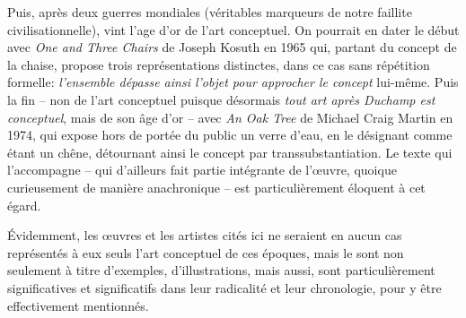 Puis, après deux guerres mondiales (véritables marqueurs de notre faillite civilisationnelle), vint l'age d'or de l'art conceptuel. On pourrait en dater le début avec \textit{One and Three Chairs} de Joseph Kosuth en 1965 qui, partant du concept de la chaise, propose trois représentations distinctes, dans ce cas sans répétition formelle: \textit{l'ensemble dépasse ainsi l’objet pour approcher le concept} lui-même. 
Puis la fin -- non de l'art conceptuel puisque désormais \textit{tout art après Duchamp est conceptuel}, %
mais de son âge d'or -- avec \textit{An Oak Tree} de Michael Craig Martin en 1974, qui expose hors de portée du public un verre d'eau, en le désignant comme étant un chêne, détournant ainsi le concept par transsubstantiation. Le texte qui l'accompagne -- qui d'ailleurs fait partie intégrante de l'œuvre, quoique curieusement de manière anachronique -- est particulièrement éloquent à cet égard.  

Évidemment, les œuvres et les artistes cités ici ne seraient en aucun cas représentés à eux seuls l'art conceptuel de ces époques, mais le sont non seulement à titre d'exemples, d'illustrations, mais aussi, sont particulièrement significatives et significatifs dans leur radicalité et leur chronologie, pour y être effectivement mentionnés.

\bigskip


